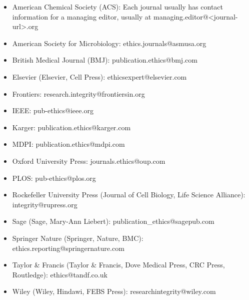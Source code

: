 \documentclass[letterpaper, 12pt]{article}
\begin{document}
\begin{itemize}
    \setlength\itemsep{-0.5em}
    \item American Chemical Society (ACS): Each journal usually has contact information for a managing editor, usually at managing.editor@<journal-url>.org
    \item American Society for Microbiology: ethics.journals@asmusa.org
    \item British Medical Journal (BMJ): publication.ethics@bmj.com
    \item Elsevier (Elsevier, Cell Press): ethicsexpert@elsevier.com
    \item Frontiers: research.integrity@frontiersin.org
    \item IEEE: pub-ethics@ieee.org
    \item Karger: publication.ethics@karger.com
    \item MDPI: publication.ethics@mdpi.com
    \item Oxford University Press: journals.ethics@oup.com
    \item PLOS: pub-ethics@plos.org
    \item Rockefeller University Press (Journal of Cell Biology, Life Science Alliance): integrity@rupress.org
    \item Sage (Sage, Mary-Ann Liebert): publication\_ethics@sagepub.com
    \item Springer Nature (Springer, Nature, BMC): ethics.reporting@springernature.com
    \item Taylor \& Francis (Taylor \& Francis, Dove Medical Press, CRC Press, Routledge): ethics@tandf.co.uk
    \item Wiley (Wiley, Hindawi, FEBS Press): researchintegrity@wiley.com
\end{itemize}
\end{document}
